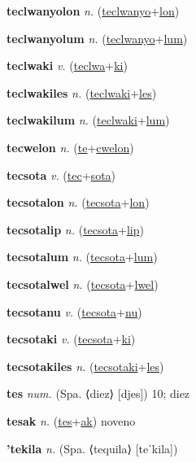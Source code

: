 \textbf{\hypertarget{teclwanyolon}{teclwanyolon}} \textit{n.} (\hyperlink{teclwanyo}{teclwanyo}+\allowbreak \hyperlink{lon}{lon})


\textbf{\hypertarget{teclwanyolum}{teclwanyolum}} \textit{n.} (\hyperlink{teclwanyo}{teclwanyo}+\allowbreak \hyperlink{lum}{lum})


\textbf{\hypertarget{teclwaki}{teclwaki}} \textit{v.} (\hyperlink{teclwa}{teclwa}+\allowbreak \hyperlink{ki}{ki})


\textbf{\hypertarget{teclwakiles}{teclwakiles}} \textit{n.} (\hyperlink{teclwaki}{teclwaki}+\allowbreak \hyperlink{les}{les})


\textbf{\hypertarget{teclwakilum}{teclwakilum}} \textit{n.} (\hyperlink{teclwaki}{teclwaki}+\allowbreak \hyperlink{lum}{lum})


\textbf{\hypertarget{tecwelon}{tecwelon}} \textit{n.} (\hyperlink{te}{te}+\allowbreak \hyperlink{cwelon}{cwelon})


\textbf{\hypertarget{tecsota}{tecsota}} \textit{v.} (\hyperlink{tec}{tec}+\allowbreak \hyperlink{sota}{sota})


\textbf{\hypertarget{tecsotalon}{tecsotalon}} \textit{n.} (\hyperlink{tecsota}{tecsota}+\allowbreak \hyperlink{lon}{lon})


\textbf{\hypertarget{tecsotalip}{tecsotalip}} \textit{n.} (\hyperlink{tecsota}{tecsota}+\allowbreak \hyperlink{lip}{lip})


\textbf{\hypertarget{tecsotalum}{tecsotalum}} \textit{n.} (\hyperlink{tecsota}{tecsota}+\allowbreak \hyperlink{lum}{lum})


\textbf{\hypertarget{tecsotalwel}{tecsotalwel}} \textit{n.} (\hyperlink{tecsota}{tecsota}+\allowbreak \hyperlink{lwel}{lwel})


\textbf{\hypertarget{tecsotanu}{tecsotanu}} \textit{v.} (\hyperlink{tecsota}{tecsota}+\allowbreak \hyperlink{nu}{nu})


\textbf{\hypertarget{tecsotaki}{tecsotaki}} \textit{v.} (\hyperlink{tecsota}{tecsota}+\allowbreak \hyperlink{ki}{ki})


\textbf{\hypertarget{tecsotakiles}{tecsotakiles}} \textit{n.} (\hyperlink{tecsotaki}{tecsotaki}+\allowbreak \hyperlink{les}{les})


\textbf{\hypertarget{tes}{tes}} \textit{num.} (Spa. ⟨diez⟩ [djes])
10; diez

\textbf{\hypertarget{tesak}{tesak}} \textit{n.} (\hyperlink{tes}{tes}+\allowbreak \hyperlink{ak}{ak})
noveno

\textbf{\hypertarget{'tekila}{'tekila}} \textit{n.} (Spa. ⟨tequila⟩ [teˈkila])


